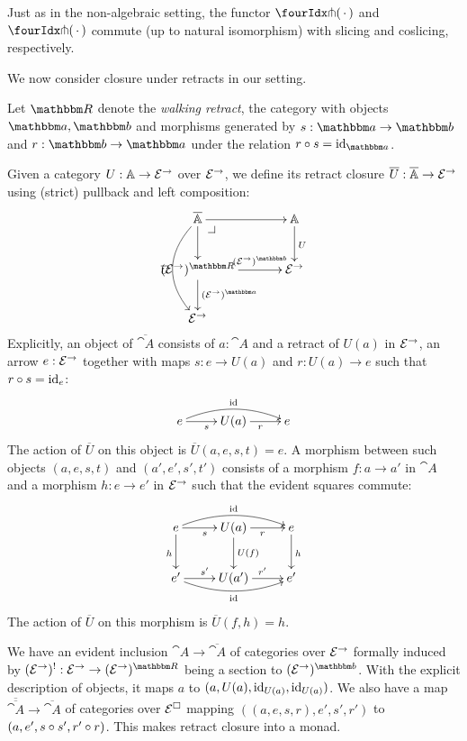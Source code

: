 \documentclass[reqno,10pt,a4paper,oneside]{amsart}
\begin{document}
\begin{remark}
\label{pitchfork-slicing}
Just as in the non-algebraic setting, the functor $\liftr{\brarghole}$ and $\liftl{\brarghole}$ commute (up to natural isomorphism) with slicing and coslicing, respectively.
\end{remark}

\medskip

We now consider closure under retracts in our setting.


Let $\ret$ denote the \emph{walking retract}, \ie the category with objects $\retA, \retB$ and morphisms generated by $s : \retA \to \retB$ and $r : \retB \to \retA$ under the relation $r \cc s = \id_{\retA}$.

Given a category $U : \mathbb{A} \to \mathcal{E}^{\to}$ over $\mathcal{E}^{\to}$, we define its retract closure $\overline{U} : \overline{\mathbb{A}} \to \mathcal{E}^{\to}$ using (strict) pullback and left composition:
\[
\xymatrix@C+1em{
  \overline{\cat{A}}
  \ar[r]
  \ar[d]
  \ar@/_2em/[dd]_{\overline{U}}
  \pullback{dr}
&
  \cat{A}
  \ar[d]^{U}
\\
  (\catE^{\to})^{\ret}
  \ar[r]^-{(\catE^{\to})^{\retB}}
  \ar[d]^{(\catE^{\to})^{\retA}}
&
  \catE^{\to}
\\
  \catE^{\to}
}
\]
Explicitly, an object of $\overline{\cat{A}}$ consists of $a : \cat{A}$ and a retract of $U(a)$ in $\mathcal{E}^{\to}$, \ie an arrow $e : \mathcal{E}^{\to}$ together with maps $s : e \to U(a)$ and $r : U(a) \to e$ such that $r \mathbin{\circ} s = \operatorname{id}_e$:
\[
\xymatrix{
  e
  \ar[r]_{s}
  \ar@/^1em/[rr]^{\id}
&
  U(a)
  \ar[r]_{r}
&
  e
}
\]
The action of $\overline{U}$ on this object is $\overline{U}(a, e, s, t) = e$.
A morphism between such objects $(a, e, s, t)$ and $(a', e', s', t')$ consists of a morphism $f : a \to a'$ in $\cat{A}$ and a morphism $h : e \to e'$ in $\mathcal{E}^{\to}$ such that the evident squares commute:
\[
\xymatrix{
  e
  \ar[r]_{s}
  \ar@/^1em/[rr]^{\id}
  \ar[d]_{h}
&
  U(a)
  \ar[r]_{r}
  \ar[d]^{U(f)}
&
  e
  \ar[d]^{h}
\\
  e'
  \ar[r]^{s'}
  \ar@/_1em/[rr]_{\id}
&
  U(a')
  \ar[r]^{r'}
&
  e'
}
\]
The action of $\overline{U}$ on this morphism is $\overline{U}(f, h) = h$.

We have an evident inclusion $\cat{A} \to \overline{\cat{A}}$ of categories over $\mathcal{E}^{\to}$ formally induced by $(\catE^{\to})^{\canonical} : \catE^{\to} \to (\catE^{\to})^{\ret}$ being a section to $(\catE^{\to})^{\retB}$.
With the explicit description of objects, it maps $a$ to $(a, U(a), \operatorname{id}_{U(a)}, \operatorname{id}_{U(a)})$.
We also have a map $\overline{\overline{\cat{A}}} \to \overline{\cat{A}}$ of categories over $\mathcal{E}^{\Box}$ mapping $((a, e, s, r), e', s', r')$ to $(a, e', s \mathbin{\circ} s', r' \mathbin{\circ} r)$.
This makes retract closure into a monad.
\end{document}
